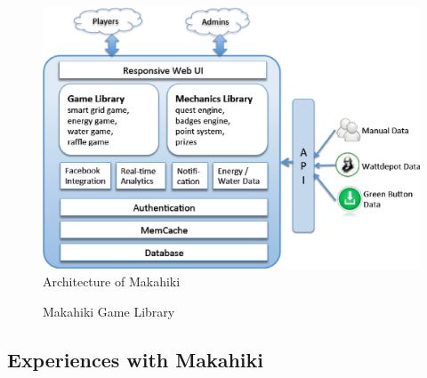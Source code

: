 \documentclass{sigchi}
\begin{document}
\begin{figure}
  \center
  \includegraphics[width=\columnwidth]{makahiki-system-architecture}
  \caption{Architecture of Makahiki}
  \label{fig:makahiki-architecture}
\end{figure}

\begin{figure}
	\center
		\caption{Makahiki Game Library}
		\label{fig:makahiki-games}
\end{figure}

\subsection{Experiences with Makahiki}
\end{document}
